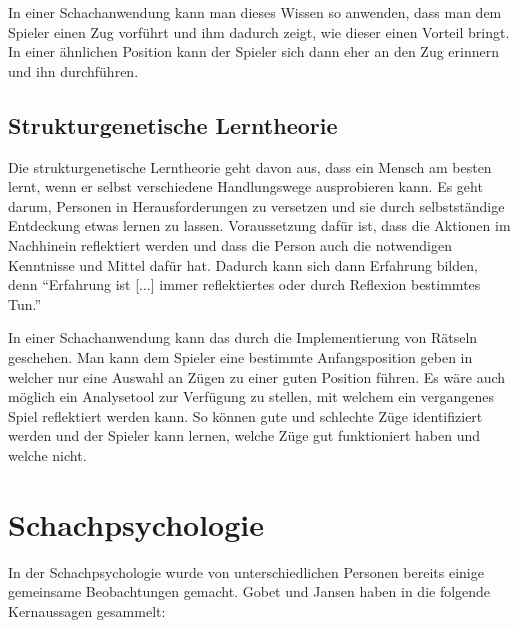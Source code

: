 In einer Schachanwendung kann man dieses Wissen so anwenden, dass man dem Spieler einen Zug vorführt und ihm dadurch zeigt,
wie dieser einen Vorteil bringt.
In einer ähnlichen Position kann der Spieler sich dann eher an den Zug erinnern und ihn durchführen.

\subsection{Strukturgenetische Lerntheorie}
Die strukturgenetische Lerntheorie geht davon aus, dass ein Mensch am besten lernt, wenn er selbst verschiedene Handlungswege ausprobieren kann. Es geht darum, Personen in Herausforderungen zu versetzen und sie durch selbstständige Entdeckung etwas lernen zu lassen. Voraussetzung dafür ist, dass die Aktionen im Nachhinein reflektiert werden und dass die Person auch die notwendigen Kenntnisse und Mittel dafür hat. Dadurch kann sich dann Erfahrung bilden, denn \enquote{Erfahrung ist [...] immer reflektiertes oder durch Reflexion bestimmtes Tun.}\cite{kron_grundwissen_2024}

In einer Schachanwendung kann das durch die Implementierung von Rätseln geschehen. Man kann dem Spieler eine bestimmte Anfangsposition geben in welcher nur eine Auswahl an Zügen zu einer guten Position führen. Es wäre auch möglich ein Analysetool zur Verfügung zu stellen, mit welchem ein vergangenes Spiel reflektiert werden kann. So können gute und schlechte Züge identifiziert werden und der Spieler kann lernen, welche Züge gut funktioniert haben und welche nicht.


\section{Schachpsychologie}%
In der Schachpsychologie wurde von unterschiedlichen Personen bereits einige gemeinsame Beobachtungen gemacht. Gobet und Jansen haben in \cite{gobet_training_2006} die folgende Kernaussagen gesammelt:

